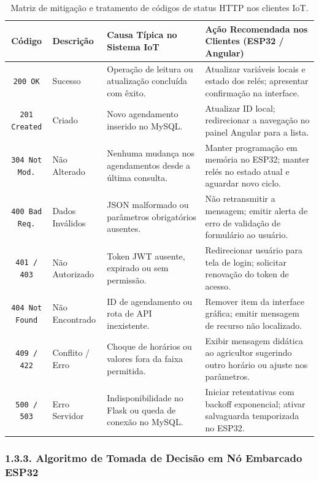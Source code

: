\begin{table}[h!]
\centering
\fontsize{9}{11}\selectfont
\caption{Matriz de mitigação e tratamento de códigos de status HTTP nos clientes IoT.}
\begin{tabular}{|c|l|p{4.2cm}|p{5.5cm}|}
\hline
\textbf{Código} & \textbf{Descrição} & \textbf{Causa Típica no Sistema IoT} & \textbf{Ação Recomendada nos Clientes (ESP32 / Angular)} \\ \hline
\texttt{200 OK} & Sucesso & Operação de leitura ou atualização concluída com êxito. & Atualizar variáveis locais e estado dos relés; apresentar confirmação na interface. \\ \hline
\texttt{201 Created} & Criado & Novo agendamento inserido no MySQL. & Atualizar ID local; redirecionar a navegação no painel Angular para a lista. \\ \hline
\texttt{304 Not Mod.} & Não Alterado & Nenhuma mudança nos agendamentos desde a última consulta. & Manter programação em memória no ESP32; manter relés no estado atual e aguardar novo ciclo. \\ \hline
\texttt{400 Bad Req.} & Dados Inválidos & JSON malformado ou parâmetros obrigatórios ausentes. & Não retransmitir a mensagem; emitir alerta de erro de validação de formulário ao usuário. \\ \hline
\texttt{401 / 403} & Não Autorizado & Token JWT ausente, expirado ou sem permissão. & Redirecionar usuário para tela de login; solicitar renovação do token de acesso. \\ \hline
\texttt{404 Not Found} & Não Encontrado & ID de agendamento ou rota de API inexistente. & Remover item da interface gráfica; emitir mensagem de recurso não localizado. \\ \hline
\texttt{409 / 422} & Conflito / Erro & Choque de horários ou valores fora da faixa permitida. & Exibir mensagem didática ao agricultor sugerindo outro horário ou ajuste nos parâmetros. \\ \hline
\texttt{500 / 503} & Erro Servidor & Indisponibilidade no Flask ou queda de conexão no MySQL. & Iniciar retentativas com backoff exponencial; ativar salvaguarda temporizada no ESP32. \\ \hline
\end{tabular}
\end{table}

\subsubsection*{1.3.3. Algoritmo de Tomada de Decisão em Nó Embarcado ESP32}

